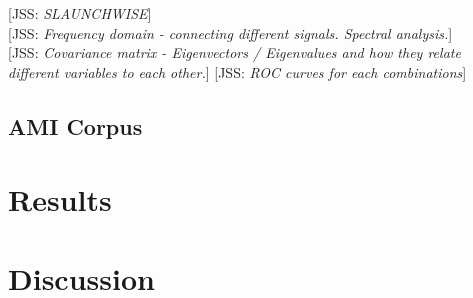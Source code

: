 \documentclass{article}
\newcommand{\meta}[1]{{\textcolor[rgb]{0.1,0.7,0.2}{[JSS: {\it #1}]}}}
\begin{document}
\meta{SLAUNCHWISE} \\ 
\meta{Frequency domain - connecting different signals. Spectral analysis.} \\
\meta{Covariance matrix - Eigenvectors / Eigenvalues and how they relate different variables to each other.}
\meta{ROC curves for each combinations}

\subsection{AMI Corpus}


\section{Results}

\section{Discussion}



\end{document}
